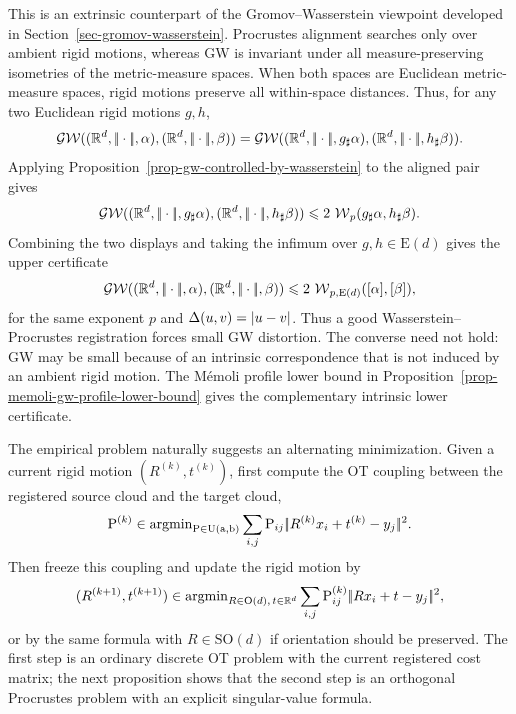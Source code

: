 This is an extrinsic counterpart of the Gromov--Wasserstein viewpoint developed in Section~\ref{sec-gromov-wasserstein}. Procrustes alignment searches only over ambient rigid motions, whereas GW is invariant under all measure-preserving isometries of the metric-measure spaces. When both spaces are Euclidean metric-measure spaces, rigid motions preserve all within-space distances. Thus, for any two Euclidean rigid motions $g,h$,
\[
\GW((\RR^d,\norm{\cdot},\alpha),(\RR^d,\norm{\cdot},\beta))
=
\GW((\RR^d,\norm{\cdot},g_\sharp\alpha),(\RR^d,\norm{\cdot},h_\sharp\beta)).
\]
Applying Proposition~\ref{prop-gw-controlled-by-wasserstein} to the aligned pair gives
\[
\operatorname{\mathcal{GW}}((\mathbb{R}^d,|\!| \cdot |\!|,g_\sharp\alpha),(\mathbb{R}^d,|\!| \cdot |\!|,h_\sharp\beta))
\leqslant
2\,\operatorname{\mathcal{W}}_p(g_\sharp\alpha,h_\sharp\beta).
\]
Combining the two displays and taking the infimum over $g,h\in\mathrm E(d)$ gives the upper certificate
\begin{equation}\label{eq-gw-procrustes-upper}
\operatorname{\mathcal{GW}}((\mathbb{R}^d,|\!| \cdot |\!|,\alpha),(\mathbb{R}^d,|\!| \cdot |\!|,\beta))
\leqslant
2\,\operatorname{\mathcal{W}}_{p,\mathrm E(d)}([\alpha],[\beta]),
\end{equation}
for the same exponent $p$ and $\Delta(u,v)=|u-v|$. Thus a good Wasserstein--Procrustes registration forces small GW distortion. The converse need not hold: GW may be small because of an intrinsic correspondence that is not induced by an ambient rigid motion. The M\'emoli profile lower bound in Proposition~\ref{prop-memoli-gw-profile-lower-bound} gives the complementary intrinsic lower certificate.

The empirical problem naturally suggests an alternating minimization. Given a current rigid motion $(R^{(k)},t^{(k)})$, first compute the OT coupling between the registered source cloud and the target cloud,
\begin{equation}\label{eq-wasserstein-procrustes-coupling-update}
	\mathrm{P}^{(k)}
	\in
	\operatorname{argmin}_{\mathrm{P}\in\mathrm{U}(\mathrm{a},\mathrm{b})}
	\sum_{i,j}\mathrm{P}_{ij}|\!| R^{(k)}x_i+t^{(k)}-y_j |\!|^2 .
\end{equation}
Then freeze this coupling and update the rigid motion by
\begin{equation}\label{eq-wasserstein-procrustes-rigid-update}
	(R^{(k+1)},t^{(k+1)})
	\in
	\operatorname{argmin}_{R\in\mathrm O(d),\,t\in\mathbb{R}^d}
	\sum_{i,j}\mathrm{P}^{(k)}_{ij}|\!| Rx_i+t-y_j |\!|^2 ,
\end{equation}
or by the same formula with $R\in\mathrm{SO}(d)$ if orientation should be preserved. The first step is an ordinary discrete OT problem with the current registered cost matrix; the next proposition shows that the second step is an orthogonal Procrustes problem with an explicit singular-value formula.

